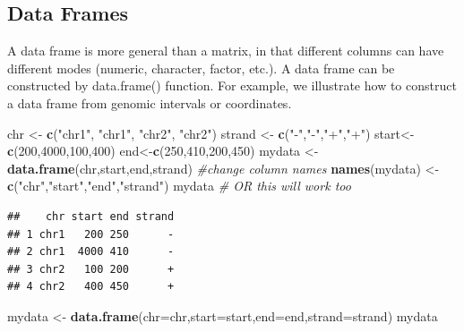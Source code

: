 \documentclass[12pt,]{krantz}
\newenvironment{Shaded}{\begin{snugshade}}{\end{snugshade}}
\newcommand{\CommentTok}[1]{\textcolor[rgb]{0.56,0.35,0.01}{\textit{#1}}}
\newcommand{\DataTypeTok}[1]{\textcolor[rgb]{0.13,0.29,0.53}{#1}}
\newcommand{\DecValTok}[1]{\textcolor[rgb]{0.00,0.00,0.81}{#1}}
\newcommand{\KeywordTok}[1]{\textcolor[rgb]{0.13,0.29,0.53}{\textbf{#1}}}
\newcommand{\NormalTok}[1]{#1}
\newcommand{\StringTok}[1]{\textcolor[rgb]{0.31,0.60,0.02}{#1}}
\theoremstyle{definition}
\theoremstyle{definition}
\theoremstyle{definition}
\theoremstyle{remark}
\begin{document}
\hypertarget{data-frames}{%
\subsection{Data Frames}\label{data-frames}}

A data frame is more general than a matrix, in that different columns
can have different modes (numeric, character, factor, etc.). A data
frame can be constructed by data.frame() function. For example, we
illustrate how to construct a data frame from genomic intervals or
coordinates.

\begin{Shaded}
\begin{Highlighting}[]
\NormalTok{chr <-}\StringTok{ }\KeywordTok{c}\NormalTok{(}\StringTok{"chr1"}\NormalTok{, }\StringTok{"chr1"}\NormalTok{, }\StringTok{"chr2"}\NormalTok{, }\StringTok{"chr2"}\NormalTok{)}
\NormalTok{strand <-}\StringTok{ }\KeywordTok{c}\NormalTok{(}\StringTok{"-"}\NormalTok{,}\StringTok{"-"}\NormalTok{,}\StringTok{"+"}\NormalTok{,}\StringTok{"+"}\NormalTok{)}
\NormalTok{start<-}\StringTok{ }\KeywordTok{c}\NormalTok{(}\DecValTok{200}\NormalTok{,}\DecValTok{4000}\NormalTok{,}\DecValTok{100}\NormalTok{,}\DecValTok{400}\NormalTok{)}
\NormalTok{end<-}\KeywordTok{c}\NormalTok{(}\DecValTok{250}\NormalTok{,}\DecValTok{410}\NormalTok{,}\DecValTok{200}\NormalTok{,}\DecValTok{450}\NormalTok{)}
\NormalTok{mydata <-}\StringTok{ }\KeywordTok{data.frame}\NormalTok{(chr,start,end,strand)}
\CommentTok{#change column names}
\KeywordTok{names}\NormalTok{(mydata) <-}\StringTok{ }\KeywordTok{c}\NormalTok{(}\StringTok{"chr"}\NormalTok{,}\StringTok{"start"}\NormalTok{,}\StringTok{"end"}\NormalTok{,}\StringTok{"strand"}\NormalTok{)}
\NormalTok{mydata }\CommentTok{# OR this will work too}
\end{Highlighting}
\end{Shaded}

\begin{verbatim}
##    chr start end strand
## 1 chr1   200 250      -
## 2 chr1  4000 410      -
## 3 chr2   100 200      +
## 4 chr2   400 450      +
\end{verbatim}

\begin{Shaded}
\begin{Highlighting}[]
\NormalTok{mydata <-}\StringTok{ }\KeywordTok{data.frame}\NormalTok{(}\DataTypeTok{chr=}\NormalTok{chr,}\DataTypeTok{start=}\NormalTok{start,}\DataTypeTok{end=}\NormalTok{end,}\DataTypeTok{strand=}\NormalTok{strand)}
\NormalTok{mydata}
\end{Highlighting}
\end{Shaded}
\end{document}
